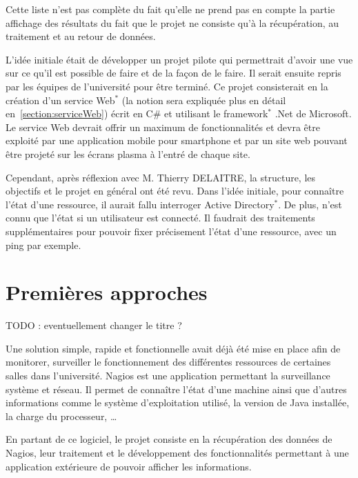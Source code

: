 Cette liste n'est pas compl\`ete du fait qu'elle ne prend pas en compte la partie \og{}affichage\fg{} des r\'esultats du fait que le projet ne consiste qu'\`a la r\'ecup\'eration, au traitement et au retour de donn\'ees.

L'id\'ee initiale \'etait de d\'evelopper un projet pilote qui permettrait d'avoir une vue sur ce qu'il est possible de faire et de la fa\c{c}on de le faire.
Il serait ensuite repris par les \'equipes de l'universit\'e pour \^etre termin\'e.
Ce projet consisterait en la cr\'eation d'un service Web$^*$ (la notion sera expliqu\'ee plus en d\'etail en~\ref{section:serviceWeb}) \'ecrit en C\# et utilisant le framework$^*$ .Net de Microsoft.
Le service Web devrait offrir un maximum de fonctionnalit\'es et devra \^etre exploit\'e par une application mobile pour smartphone et par un site web pouvant \^etre projet\'e sur les \'ecrans plasma \`a l'entr\'e de chaque site.

Cependant, apr\`es r\'eflexion avec M. Thierry DELAITRE, la structure, les objectifs et le projet en g\'en\'eral ont \'et\'e revu.
Dans l'id\'ee initiale, pour conna\^itre l'\'etat d'une ressource, il aurait fallu interroger Active Directory$^*$. 
De plus, n'est connu que l'\'etat si un utilisateur est connect\'e.
Il faudrait des traitements suppl\'ementaires pour pouvoir fixer pr\'ecisement l'\'etat d'une ressource, avec un ping par exemple.

\section{Premi\`eres approches}

 TODO : eventuellement changer le titre ?

Une solution simple, rapide et fonctionnelle avait d\'ej\`a \'et\'e mise en place afin de \og{}monitorer\fg{}, surveiller le fonctionnement des diff\'erentes ressources de certaines salles dans l'universit\'e.
Nagios est une application permettant la surveillance syst\`eme et r\'eseau.
Il permet de conna\^itre l'\'etat d'une machine ainsi que d'autres informations comme le syst\`eme d'exploitation utilis\'e, la version de Java install\'ee, la charge du processeur, \ldots

En partant de ce logiciel, le projet consiste en la r\'ecup\'eration des donn\'ees de Nagios, leur traitement et le d\'eveloppement des fonctionnalit\'es permettant \`a une application ext\'erieure de pouvoir afficher les informations.

